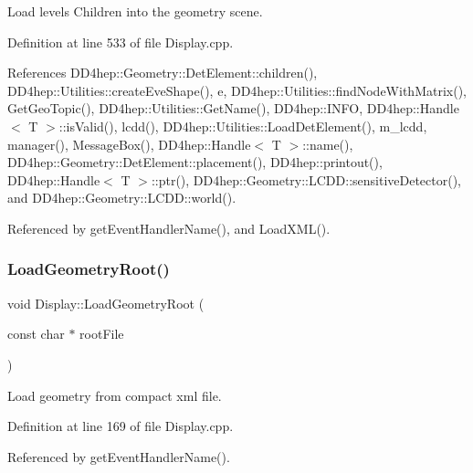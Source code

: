 Load \textquotesingle{}levels\textquotesingle{} Children into the geometry scene. 



Definition at line 533 of file Display.\+cpp.



References D\+D4hep\+::\+Geometry\+::\+Det\+Element\+::children(), D\+D4hep\+::\+Utilities\+::create\+Eve\+Shape(), e, D\+D4hep\+::\+Utilities\+::find\+Node\+With\+Matrix(), Get\+Geo\+Topic(), D\+D4hep\+::\+Utilities\+::\+Get\+Name(), D\+D4hep\+::\+I\+N\+FO, D\+D4hep\+::\+Handle$<$ T $>$\+::is\+Valid(), lcdd(), D\+D4hep\+::\+Utilities\+::\+Load\+Det\+Element(), m\+\_\+lcdd, manager(), Message\+Box(), D\+D4hep\+::\+Handle$<$ T $>$\+::name(), D\+D4hep\+::\+Geometry\+::\+Det\+Element\+::placement(), D\+D4hep\+::printout(), D\+D4hep\+::\+Handle$<$ T $>$\+::ptr(), D\+D4hep\+::\+Geometry\+::\+L\+C\+D\+D\+::sensitive\+Detector(), and D\+D4hep\+::\+Geometry\+::\+L\+C\+D\+D\+::world().



Referenced by get\+Event\+Handler\+Name(), and Load\+X\+M\+L().

\hypertarget{class_d_d4hep_1_1_display_a6f599f1026155bd68b860fa4f9904d62}{}\label{class_d_d4hep_1_1_display_a6f599f1026155bd68b860fa4f9904d62} 
\subsubsection{\texorpdfstring{Load\+Geometry\+Root()}{LoadGeometryRoot()}}
{\footnotesize\ttfamily void Display\+::\+Load\+Geometry\+Root (\begin{DoxyParamCaption}\item[{const char $\ast$}]{root\+File }\end{DoxyParamCaption})}



Load geometry from compact xml file. 



Definition at line 169 of file Display.\+cpp.



Referenced by get\+Event\+Handler\+Name().

\hypertarget{class_d_d4hep_1_1_display_ade2c0fff0fb152ea4605c30c5516c319}{}\label{class_d_d4hep_1_1_display_ade2c0fff0fb152ea4605c30c5516c319} 
